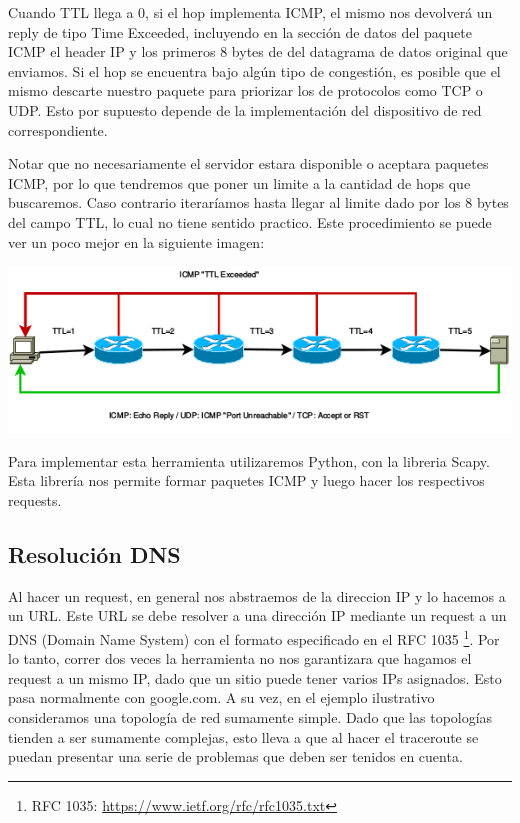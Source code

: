 Cuando TTL llega a 0, si el hop implementa ICMP, el mismo nos devolverá un reply de tipo Time Exceeded, incluyendo en la sección de datos del paquete ICMP el header IP y los primeros 8 bytes de del datagrama de datos original que enviamos. Si el hop se encuentra bajo algún tipo de congestión, es posible que el mismo descarte nuestro paquete para priorizar los de protocolos como TCP o UDP. Esto por supuesto depende de la implementación del dispositivo de red correspondiente.

Notar que no necesariamente el servidor estara disponible o aceptara paquetes ICMP, por lo que tendremos que poner un limite a la cantidad de hops que buscaremos. Caso contrario iteraríamos hasta llegar al limite dado por los 8 bytes del campo TTL, lo cual no tiene sentido practico. Este procedimiento se puede ver un poco mejor en la siguiente imagen:

\includegraphics[width=\textwidth,keepaspectratio]{images/traceroute_typical}

Para implementar esta herramienta utilizaremos Python, con la libreria Scapy. Esta librería nos permite formar paquetes ICMP y luego hacer los respectivos requests.

\subsection{Resolución DNS}

Al hacer un request, en general nos abstraemos de la direccion IP y lo hacemos a un URL. Este URL se debe resolver a una dirección IP mediante un request a un DNS (Domain Name System) con el formato especificado en el RFC 1035 \footnote{RFC 1035: \url{https://www.ietf.org/rfc/rfc1035.txt}}. Por lo tanto, correr dos veces la herramienta no nos garantizara que hagamos el request a un mismo IP, dado que un sitio puede tener varios IPs asignados. Esto pasa normalmente con google.com. A su vez, en el ejemplo ilustrativo consideramos una topología de red sumamente simple. Dado que las topologías tienden a ser sumamente complejas, esto lleva a que al hacer el traceroute se puedan presentar una serie de problemas que deben ser tenidos en cuenta.

